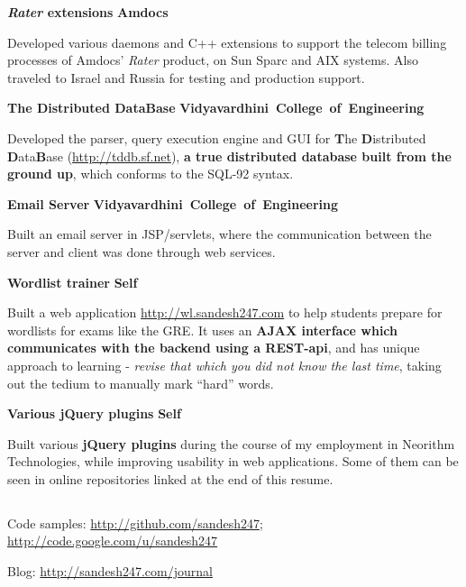 \documentclass[a4paper,11pt,final]{article}
\newcommand{\resumetitle}[1]{%
  \subsection*{%
    \Large\sc{\textbf{#1}}%
  }%

}%
\newcommand{\projexp}[2]{%
  \vspace{12pt}
  \noindent\textbf{{#1}}
  \hfill
  \hbox{\textbf{{#2}}}
  \\ \vspace{-12pt}
}
\newcommand{\resumedescheader}[1]{%
  \bigskip
  \resumetitle{#1}
}%
\begin{document}
\projexp{\textit{Rater} extensions}{Amdocs}

\noindent Developed various daemons and C++ extensions to support the
telecom billing processes of Amdocs' \textit{Rater} product, on Sun
Sparc and AIX systems. Also traveled to Israel and Russia for
testing and production support.

\projexp{The Distributed DataBase}{Vidyavardhini College of
  Engineering}

\noindent Developed the parser, query execution engine and GUI for
\textbf{T}he \textbf{D}istributed \textbf{D}ata\textbf{B}ase
(\url{http://tddb.sf.net}), \textbf{a true distributed database built
  from the ground up}, which conforms to the SQL-92 syntax.

\projexp{Email Server}{Vidyavardhini College of Engineering}

\noindent Built an email server in JSP/servlets, where the
communication between the server and client was done through web
services.

\projexp{Wordlist trainer}{Self}

\noindent Built a web application \url{http://wl.sandesh247.com} to
help students prepare for wordlists for exams like the GRE. It uses an
\textbf{AJAX interface which communicates with the backend using a
  REST-api}, and has unique approach to learning - \textit{revise that
  which you did not know the last time}, taking out the tedium to
manually mark ``hard'' words.

\projexp{Various jQuery plugins}{Self}

\noindent Built various \textbf{jQuery plugins} during the course of
my employment in Neorithm Technologies, while improving usability in
web applications. Some of them can be seen in online repositories
linked at the end of this resume.


\resumedescheader{Links}
\begin{itemize*}
\item  Code samples: \url{http://github.com/sandesh247}; \url{http://code.google.com/u/sandesh247}
\item  Blog: \url{http://sandesh247.com/journal}
\end{itemize*}
\end{document}
